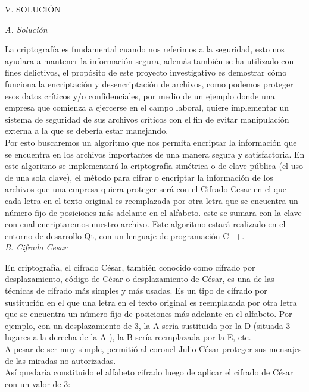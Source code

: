 \documentclass[9pt,24pt,twocolumn]{article}
\begin{document}
\begin{center}
{V.  SOLUCIÓN}
\end{center}

\textit{{A. Solución}}

{La criptografía es fundamental cuando nos referimos a la seguridad, esto nos ayudara a mantener la información segura, además también se ha utilizado con fines delictivos, el propósito de este proyecto investigativo es demostrar cómo funciona la encriptación y desencriptación de archivos, como podemos proteger esos datos críticos y/o confidenciales, por medio de un ejemplo donde una empresa que comienza a ejercerse en el campo laboral, quiere implementar un sistema de seguridad de sus archivos críticos con el fin de evitar manipulación externa a la que se debería estar manejando.}
\\

{Por esto buscaremos un algoritmo que nos permita encriptar la información que se encuentra en los archivos importantes de una manera segura y satisfactoria.  En este algoritmo se implementará la criptografía simétrica o de clave pública (el uso de una sola clave), el método para cifrar o encriptar la información de los archivos que una empresa quiera proteger será con el Cifrado Cesar en el que cada letra en el texto original es reemplazada por otra letra que se encuentra un número fijo de posiciones más adelante en el alfabeto. este se sumara con la clave con cual encriptaremos nuestro archivo. Este algoritmo estará realizado en el entorno de desarrollo Qt, con un lenguaje de programación C++.}
\\

\textit{{B. Cifrado Cesar}}

{En criptografía, el cifrado César, también conocido como cifrado por desplazamiento, código de César o desplazamiento de César, es una de las técnicas de cifrado más simples y más usadas. Es un tipo de cifrado por sustitución en el que una letra en el texto original es reemplazada por otra letra que se encuentra un número fijo de posiciones más adelante en el alfabeto. Por ejemplo, con un desplazamiento de 3, la A sería sustituida por la D (situada 3 lugares a la derecha de la A ), la B sería reemplazada por la E, etc.}
\\

{A pesar de ser muy simple, permitió al coronel Julio César proteger sus mensajes de las miradas no autorizadas.}
\\

{Así quedaría constituido el alfabeto cifrado luego de aplicar el cifrado de César con un valor de 3:}
\end{document}
